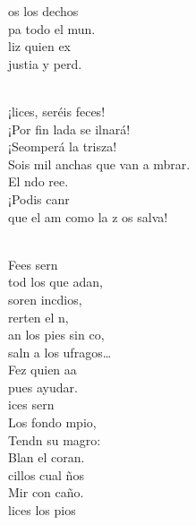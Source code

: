 \begin{cancion}
	os los dechos\\
	pa todo el mun.\\
	liz quien ex\\
	justia y perd. \\\jump\\
	\begin{chorus}%
	¡lices, seréis feces! \\
	¡Por fin lada se ilnará!\\
	¡Seomperá la trisza!\\
	Sois mil anchas que van a mbrar.\\
	El ndo ree.\\
	¡Podis canr\\
	que el am como la z os salva!\\
	\end{chorus}%
	\jump\\
	Fees sern\\
	tod los que adan,\\
	soren incdios,\\
	rerten el n,\\
	an los pies sin co,\\
	saln a los ufragos… \\
	Fez quien aa\\
	pues  ayudar.\\
\jump
	ices sern\\
	Los  fondo mpio,\\
	Tendn su magro:\\
	Blan el coran. \\
	cillos cual ños\\
	Mir con caño.\\
	lices los pios\\

\end{cancion}

